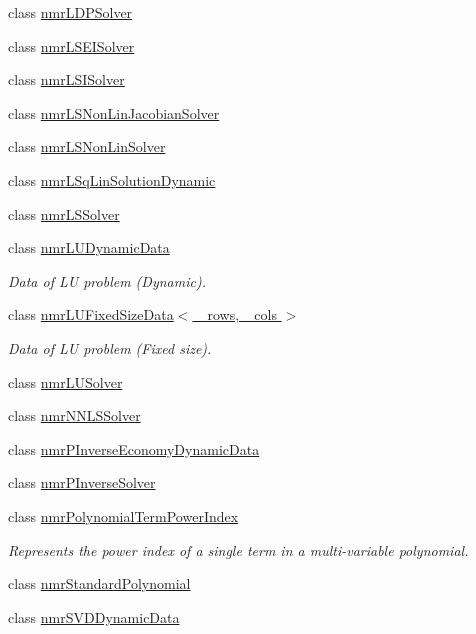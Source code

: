 \begin{DoxyCompactItemize}
class \hyperlink{classnmr_l_d_p_solver}{nmr\-L\-D\-P\-Solver}
\item 
class \hyperlink{classnmr_l_s_e_i_solver}{nmr\-L\-S\-E\-I\-Solver}
\item 
class \hyperlink{classnmr_l_s_i_solver}{nmr\-L\-S\-I\-Solver}
\item 
class \hyperlink{classnmr_l_s_non_lin_jacobian_solver}{nmr\-L\-S\-Non\-Lin\-Jacobian\-Solver}
\item 
class \hyperlink{classnmr_l_s_non_lin_solver}{nmr\-L\-S\-Non\-Lin\-Solver}
\item 
class \hyperlink{classnmr_l_sq_lin_solution_dynamic}{nmr\-L\-Sq\-Lin\-Solution\-Dynamic}
\item 
class \hyperlink{classnmr_l_s_solver}{nmr\-L\-S\-Solver}
\item 
class \hyperlink{classnmr_l_u_dynamic_data}{nmr\-L\-U\-Dynamic\-Data}
\begin{DoxyCompactList}\small\item\em Data of L\-U problem (Dynamic). \end{DoxyCompactList}\item 
class \hyperlink{classnmr_l_u_fixed_size_data}{nmr\-L\-U\-Fixed\-Size\-Data$<$ \-\_\-rows, \-\_\-cols $>$}
\begin{DoxyCompactList}\small\item\em Data of L\-U problem (Fixed size). \end{DoxyCompactList}\item 
class \hyperlink{classnmr_l_u_solver}{nmr\-L\-U\-Solver}
\item 
class \hyperlink{classnmr_n_n_l_s_solver}{nmr\-N\-N\-L\-S\-Solver}
\item 
class \hyperlink{classnmr_p_inverse_economy_dynamic_data}{nmr\-P\-Inverse\-Economy\-Dynamic\-Data}
\item 
class \hyperlink{classnmr_p_inverse_solver}{nmr\-P\-Inverse\-Solver}
\item 
class \hyperlink{classnmr_polynomial_term_power_index}{nmr\-Polynomial\-Term\-Power\-Index}
\begin{DoxyCompactList}\small\item\em Represents the power index of a single term in a multi-\/variable polynomial. \end{DoxyCompactList}\item 
class \hyperlink{classnmr_standard_polynomial}{nmr\-Standard\-Polynomial}
\item 
class \hyperlink{classnmr_s_v_d_dynamic_data}{nmr\-S\-V\-D\-Dynamic\-Data}

\end{DoxyCompactItemize}
